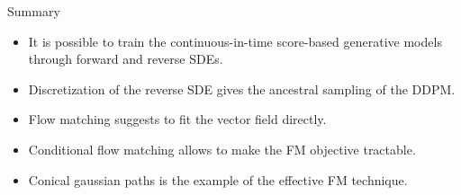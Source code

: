 \begin{frame}{Summary}
	\begin{itemize}
		\item It is possible to train the continuous-in-time score-based generative models through forward and reverse SDEs.
		\vfill
		\item Discretization of the reverse SDE gives the ancestral sampling of the DDPM.
		\vfill
		\item Flow matching suggests to fit the vector field directly.
		\vfill
		\item Conditional flow matching allows to make the FM objective tractable.
		\vfill
		\item Conical gaussian paths is the example of the effective FM technique.
	\end{itemize}
\end{frame}
 